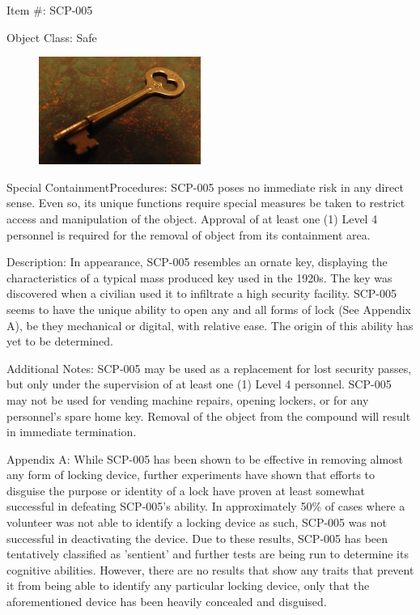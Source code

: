 Item \#: SCP-005

Object Class: Safe

\begin{figure}
\includegraphics[scale=1]{scp/005.jpg}
\end{figure}

Special Containment\linebreak Procedures: SCP-005 poses no immediate risk in any direct sense. Even so, its unique functions require special measures be taken to restrict access and manipulation of the object. Approval of at least one (1) Level 4 personnel is required for the removal of object from its containment area.

Description: In appearance, SCP-005 resembles an ornate key, displaying the characteristics of a typical mass produced key used in the 1920s. The key was discovered when a civilian used it to infiltrate a high security facility. SCP-005 seems to have the unique ability to open any and all forms of lock (See Appendix A), be they mechanical or digital, with relative ease. The origin of this ability has yet to be determined.

Additional Notes: SCP-005 may be used as a replacement for lost security passes, but only under the supervision of at least one (1) Level 4 personnel. SCP-005 may not be used for vending machine repairs, opening lockers, or for any personnel's spare home key. Removal of the object from the compound will result in immediate termination.

Appendix A: While SCP-005 has been shown to be effective in removing almost any form of locking device, further experiments have shown that efforts to disguise the purpose or identity of a lock have proven at least somewhat successful in defeating SCP-005's ability. In approximately 50\% of cases where a volunteer was not able to identify a locking device as such, SCP-005 was not successful in deactivating the device. Due to these results, SCP-005 has been tentatively classified as 'sentient' and further tests are being run to determine its cognitive abilities. However, there are no results that show any traits that prevent it from being able to identify any particular locking device, only that the aforementioned device has been heavily concealed and disguised.